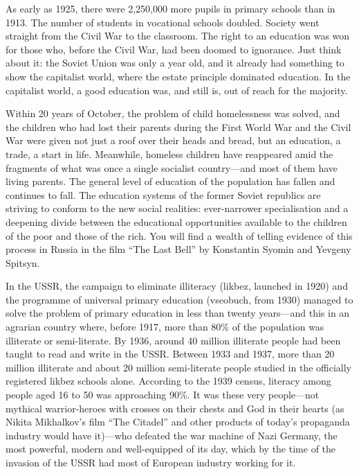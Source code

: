 \documentclass[../main]{subfiles}
\begin{document}
As early as 1925, there were 2,250,000 more pupils in primary schools than in 1913. The number of students in vocational schools doubled. Society went straight from the Civil War to the classroom. The right to an education was won for those who, before the Civil War, had been doomed to ignorance. Just think about it: the Soviet Union was only a year old, and it already had something to show the capitalist world, where the estate principle dominated education. In the capitalist world, a good education was, and still is, out of reach for the majority.

Within 20 years of October, the problem of child homelessness was solved, and the children who had lost their parents during the First World War and the Civil War were given not just a roof over their heads and bread, but an education, a trade, a start in life. Meanwhile, homeless children have reappeared amid the fragments of what was once a single socialist country—and most of them have living parents. The general level of education of the population has fallen and continues to fall. The education systems of the former Soviet republics are striving to conform to the new social realities: ever-narrower specialisation and a deepening divide between the educational opportunities available to the children of the poor and those of the rich. You will find a wealth of telling evidence of this process in Russia in the film “The Last Bell” by Konstantin Syomin and Yevgeny Spitsyn.

In the USSR, the campaign to eliminate illiteracy (likbez, launched in 1920) and the programme of universal primary education (vseobuch, from 1930) managed to solve the problem of primary education in less than twenty years—and this in an agrarian country where, before 1917, more than 80\% of the population was illiterate or semi-literate. By 1936, around 40 million illiterate people had been taught to read and write in the USSR. Between 1933 and 1937, more than 20 million illiterate and about 20 million semi-literate people studied in the officially registered likbez schools alone. According to the 1939 census, literacy among people aged 16 to 50 was approaching 90\%. It was these very people—not mythical warrior-heroes with crosses on their chests and God in their hearts (as Nikita Mikhalkov’s film “The Citadel” and other products of today’s propaganda industry would have it)—who defeated the war machine of Nazi Germany, the most powerful, modern and well-equipped of its day, which by the time of the invasion of the USSR had most of European industry working for it.
\end{document}
